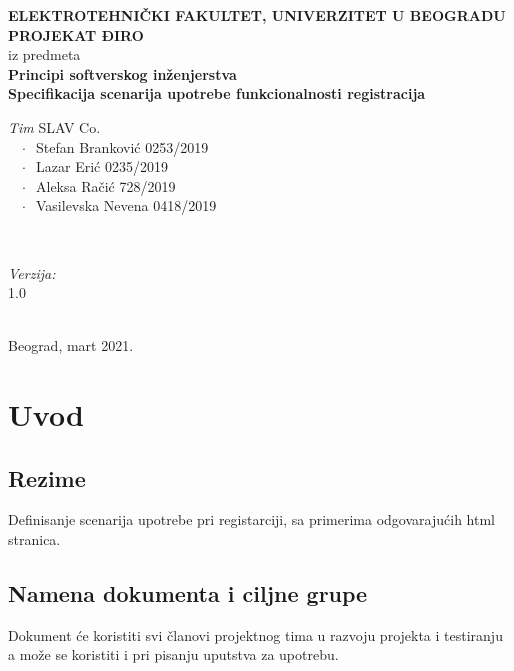 \documentclass[12pt]{article}
\begin{document}
    \renewcommand{\labelenumii}{\arabic{enumi}.\arabic{enumii}}
	\begin{titlepage}  
		\center
		\textbf{ \LARGE ELEKTROTEHNIČKI FAKULTET, UNIVERZITET U BEOGRADU } \\[4cm]
		\textbf{ \Large PROJEKAT ĐIRO\texttrademark} \\[0.3cm]
		iz predmeta \\[0.3cm]
		\textbf{ \Large Principi softverskog inženjerstva} \\[0.7cm]
		{ \huge \bfseries Specifikacija scenarija upotrebe funkcionalnosti registracija } \\[6cm]
		

		\begin{minipage}{0.5\textwidth}
			\begin{flushleft}
				\large
				\emph{Tim} SLAV Co. \\
			     $\;\;\; \cdot \;\;$Stefan Branković  0253/2019\\
			     $\;\;\; \cdot \;\;$Lazar Erić 0235/2019\\
			     $\;\;\; \cdot \;\;$Aleksa Račić 728/2019\\
			     $\;\;\; \cdot \;\;$Vasilevska Nevena 0418/2019
			\end{flushleft}
		\end{minipage}
		~
		\begin{minipage}{0.4\textwidth}
			\begin{flushright}
				\large
				\emph{Verzija:} \\
				1.0
			\end{flushright}
		\end{minipage} \\[2cm]
		\enlargethispage{4\baselineskip}
		{ \large Beograd, mart 2021. }
		\vfill
	\end{titlepage}
\pagebreak
\tableofcontents
\pagebreak



\section{Uvod}
\subsection{Rezime}
Definisanje scenarija upotrebe pri registarciji, sa primerima odgovarajućih html stranica.
\subsection{Namena dokumenta i ciljne grupe}
Dokument će koristiti svi članovi projektnog tima u razvoju projekta i testiranju a može se koristiti i pri pisanju uputstva za
upotrebu.
\end{document}
